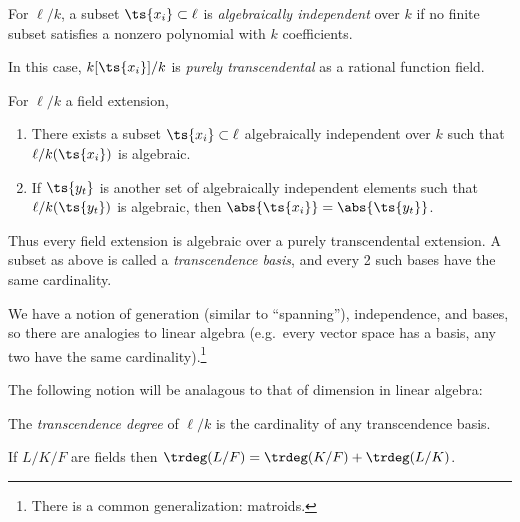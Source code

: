 \begin{definition}

For \(\ell/k\), a subset \(\ts{x_i}\subset \ell\) is \emph{algebraically
independent} over \(k\) if no finite subset satisfies a nonzero
polynomial with \(k\) coefficients.

In this case, \(k[\ts{x_i}] / k\) is \emph{purely transcendental} as a
rational function field.

\end{definition}

\begin{theorem}

For \(\ell/k\) a field extension,

\begin{enumerate}
\def\labelenumi{\alph{enumi}.}
\item
  There exists a subset \(\ts{x_i}\subset \ell\) algebraically
  independent over \(k\) such that \(\ell/k(\ts{x_i})\) is algebraic.
\item
  If \(\ts{y_t}\) is another set of algebraically independent elements
  such that \(\ell/k(\ts{y_t})\) is algebraic, then
  \(\abs{\ts{x_i}} = \abs{\ts{y_t}}\).
\end{enumerate}

\end{theorem}

Thus every field extension is algebraic over a purely transcendental
extension. A subset as above is called a \emph{transcendence basis}, and
every 2 such bases have the same cardinality.

We have a notion of generation (similar to ``spanning''), independence,
and bases, so there are analogies to linear algebra (e.g.~every vector
space has a basis, any two have the same cardinality).\footnote{There is
  a common generalization: matroids.}

The following notion will be analagous to that of dimension in linear
algebra:

\begin{definition}

The \emph{transcendence degree} of \(\ell/k\) is the cardinality of any
transcendence basis.

\end{definition}

\begin{theorem}

If \(L/K/F\) are fields then
\(\trdeg(L/F) = \trdeg(K/F) + \trdeg(L/K)\).

\end{theorem}

